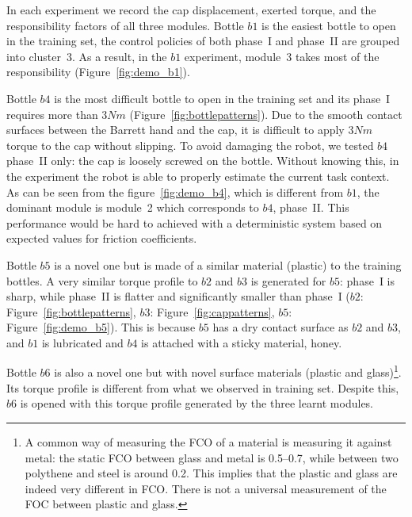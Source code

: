 In each experiment we record the cap displacement, exerted torque, and
the responsibility factors of all three modules. Bottle $b1$ is the
easiest bottle to open in the training set, the control policies of
both phase~I and phase~II are grouped into cluster~3. As a result,
in the $b1$ experiment, module~3 takes most of the responsibility
(Figure~\ref{fig:demo_b1}).

Bottle $b4$ is the most difficult bottle to open in the training set
and its phase~I requires more than $3Nm$
(Figure~\ref{fig:bottlepatterns}). Due to the smooth contact surfaces
between the Barrett hand and the cap, it is difficult to apply $3Nm$
torque to the cap without slipping. To avoid damaging the robot, we
tested $b4$ phase~II only: the cap is loosely screwed on the
bottle. Without knowing this, in the experiment the robot is able to
properly estimate the current task context. As can be seen from the
figure~\ref{fig:demo_b4}, which is different from $b1$, the dominant
module is module~2 which corresponds to  $b4$, phase~II. This
performance would be hard to achieved with a deterministic system based
on expected values for friction coefficients.

Bottle $b5$ is a novel one but is made of a similar material (plastic) to
the training bottles. A very similar torque profile to $b2$ and $b3$ is
generated for $b5$: phase~I is sharp, while phase~II is flatter and
significantly smaller than phase~I ($b2$:
Figure~\ref{fig:bottlepatterns}, $b3$: Figure~\ref{fig:cappatterns},
$b5$: Figure~\ref{fig:demo_b5}). This is because $b5$ has a dry contact
surface as $b2$ and $b3$, and $b1$ is lubricated and $b4$ is attached with
a sticky material, honey.

Bottle $b6$ is also a novel one but with novel surface materials
(plastic and glass)\footnote{A common way of measuring the FCO of a
  material is measuring it against metal: the static FCO between glass
  and metal is 0.5--0.7, while between two polythene and steel is
  around 0.2. This implies that the plastic and glass are indeed very
  different in FCO. There is not a universal measurement of the FOC
  between plastic and glass.}. Its torque profile is different from
what we observed in training set. Despite this, $b6$ is opened with this
torque profile generated by the three learnt modules.

